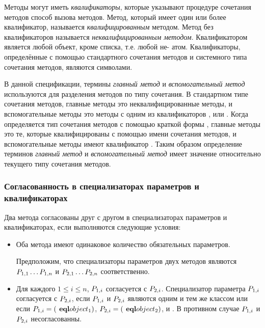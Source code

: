 Методы могут иметь \emph{квалификаторы}, которые указывают процедуре сочетания
методов способ вызова методов. Метод, который имеет один или более
квалификатор, называется \emph{квалифицированным} методом.
Метод без квалификаторов называется \emph{неквалифицированным методом}.
Квалификатором является любой объект, кроме списка, т.е. любой не-
атом. Квалификаторы, определённые с помощью стандартного сочетания методов и
системного типа сочетания методов, являются символами. 

В данной спецификации, термины \emph{главный метод} и \emph{вспомогательный
  метод} используются для разделения методов по типу сочетания. В стандартном
типе сочетания методов, главные методы это неквалифицированные методы, и
вспомогательные методы это методы с одним из квалификаторов ,
 или . Когда определяется тип сочетания методов с помощью
краткой формы , главные методы это те, которые
квалифицированы с помощью имени сочетания методов, и вспомогательные методы имеют
квалификатор . Таким образом определение терминов \emph{главный метод} и
\emph{вспомогательный метод} имеет значение относительно текущего типу сочетания
методов.

\subsubsection{Согласованность в специализаторах параметров и квалификаторах}
\label{Agreement-on-Parameter-Specializers-and-Qualifiers-SECTION}

Два метода согласованы друг с другом в специализаторах параметров и
квалификаторах, если выполняются следующие условия:

\begin{itemize}
\item Оба метода имеют одинаковое количество обязательных
  параметров.

Предположим, что специализаторы параметров двух методов являются 
$P_{1,1}\ldots P_{1,n}$
и $P_{2,1}\ldots P_{2,n}$ соответственно.

\item Для каждого $1\leq i\leq n$, $P_{1,i}$ согласуется с $P_{2,i}$.
Специализатор параметра $P_{1,i}$ согласуется с $P_{2,i}$, если
$P_{1,i}$ и $P_{2,i}$ являются одним и тем же классом или если
$P\sub{1,i}=(\cdf{eql} object_1)$, 
$P\sub{2,i}=(\cdf{eql} object_2)$, и
.
В противном случае $P_{1,i}$ и $P_{2,i}$ несогласованны.
\end{itemize}

